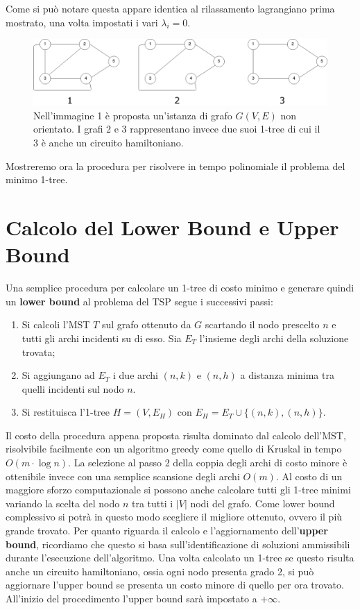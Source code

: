 \documentclass[
    article,            %
    12pt,                %
    oneside,            %
    a4paper,            %
    english,            %
    italian,                %
    sumario=tradicional,
]{abntex2}
\begin{document}
    Come si può notare questa appare identica al rilassamento lagrangiano prima mostrato, una volta impostati i vari $\lambda_i = 0$.
    \begin{figure}[h]
        \centering
        \includegraphics[scale=0.35]{files/1TreeEsempi}
        \caption{Nell'immagine 1 è proposta un'istanza di grafo $G(V,E)$ non orientato. I grafi 2 e 3 rappresentano invece due suoi 1-tree di cui il 3 è anche un circuito hamiltoniano.}
    \end{figure}
    \newline
    Mostreremo ora la procedura per risolvere in tempo polinomiale il problema del minimo 1-tree.


    \section{Calcolo del Lower Bound e Upper Bound}\label{sec:calcolo-del-lower-bound-e-upper-bound}
    Una semplice procedura per calcolare un 1-tree di costo minimo e generare quindi un \textbf{lower bound} al problema del TSP segue i successivi passi:
    \begin{enumerate}
        \item Si calcoli l'MST $T$ sul grafo ottenuto da $G$ scartando il nodo prescelto $n$ e tutti gli archi incidenti su di esso.
        Sia $E_T$ l'insieme degli archi della soluzione trovata;
        \item Si aggiungano ad $E_T$ i due archi $(n,k)$ e $(n,h)$ a distanza minima tra quelli incidenti sul nodo $n$.
        \item Si restituisca l'1-tree $H = (V, E_H)$ con $E_H = E_T \cup \{(n,k),(n,h)\}$.
    \end{enumerate}
    Il costo della procedura appena proposta risulta dominato dal calcolo dell'MST, risolvibile facilmente con un algoritmo greedy come quello di Kruskal in tempo $O(m\cdot \log n)$.
    La selezione al passo 2 della coppia degli archi di costo minore è ottenibile invece con una semplice scansione degli archi $O(m)$.
    \newline
    Al costo di un maggiore sforzo computazionale si possono anche calcolare tutti gli 1-tree minimi variando la scelta del nodo $n$ tra tutti i $|V|$ nodi del grafo.
    Come lower bound complessivo si potrà in questo modo scegliere il migliore ottenuto, ovvero il più grande trovato.
    \newline
    Per quanto riguarda il calcolo e l'aggiornamento dell'\textbf{upper bound}, ricordiamo che questo si basa sull'identificazione di soluzioni ammissibili durante l'esecuzione dell'algoritmo.
    Una volta calcolato un 1-tree se questo risulta anche un circuito hamiltoniano, ossia ogni nodo presenta grado 2, si può aggiornare l'upper bound se presenta un costo minore di quello per ora trovato.
    All'inizio del procedimento l'upper bound sarà impostato a $ + \infty$.
\end{document}
